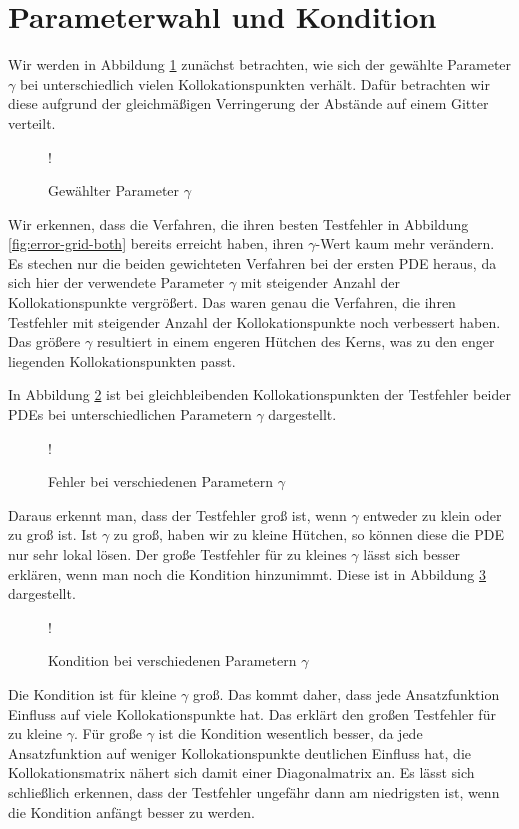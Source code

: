 \section{Parameterwahl und Kondition}
Wir werden in Abbildung \ref{fig:gamma-grid} zunächst betrachten, wie sich der gewählte Parameter $\gamma$ bei unterschiedlich vielen Kollokationspunkten verhält. Dafür betrachten wir diese aufgrund der gleichmäßigen Verringerung der Abstände auf einem Gitter verteilt. 

\begin{figure}[ht]
\centering
\resizebox {\columnwidth} {!} {

}
\caption{Gewählter Parameter $\gamma$}
\label{fig:gamma-grid}
\end{figure}
Wir erkennen, dass die Verfahren, die ihren besten Testfehler in Abbildung \ref{fig:error-grid-both} bereits erreicht haben, ihren $\gamma$-Wert kaum mehr verändern. Es stechen nur die beiden gewichteten Verfahren bei der ersten \ac{PDE} heraus, da sich hier der verwendete Parameter $\gamma$ mit steigender Anzahl der Kollokationspunkte vergrößert. Das waren genau die Verfahren, die ihren Testfehler mit steigender Anzahl der Kollokationspunkte noch verbessert haben. Das größere $\gamma$ resultiert in einem engeren \glqq Hütchen\grqq{} des Kerns, was zu den enger liegenden Kollokationspunkten passt.

In Abbildung \ref{fig:gamma-fehler} ist bei gleichbleibenden Kollokationspunkten der Testfehler beider \acp{PDE} bei unterschiedlichen Parametern $\gamma$ dargestellt.
\begin{figure}[ht]
\centering
\resizebox {\columnwidth} {!} {

}
\caption{Fehler bei verschiedenen Parametern $\gamma$}
\label{fig:gamma-fehler}
\end{figure}
Daraus erkennt man, dass der Testfehler groß ist, wenn $\gamma$ entweder zu klein oder zu groß ist. Ist $\gamma$ zu groß, haben wir zu kleine \glqq Hütchen\grqq , so können diese die \ac{PDE} nur sehr lokal lösen. Der große Testfehler für zu kleines $\gamma$ lässt sich besser erklären, wenn man noch die Kondition hinzunimmt. Diese ist in Abbildung \ref{fig:kondition} dargestellt.
\begin{figure}[ht]
\centering
\resizebox {\columnwidth} {!} {

}
\caption{Kondition bei verschiedenen Parametern $\gamma$}
\label{fig:kondition}
\end{figure}
Die Kondition ist für kleine $\gamma$ groß. Das kommt daher, dass jede Ansatzfunktion \glqq Einfluss\grqq{}  auf viele Kollokationspunkte hat. Das erklärt den großen Testfehler für zu kleine $\gamma$. Für große $\gamma$ ist die Kondition wesentlich besser, da jede Ansatzfunktion auf weniger Kollokationspunkte deutlichen \glqq Einfluss\grqq{} hat, die Kollokationsmatrix nähert sich damit einer Diagonalmatrix an. Es lässt sich schließlich erkennen, dass der Testfehler ungefähr dann am niedrigsten ist, wenn die Kondition anfängt besser zu werden. 

